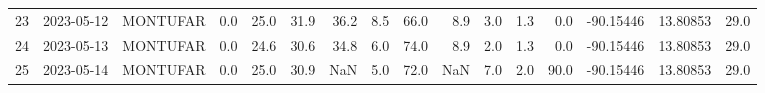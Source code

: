 \documentclass[12pt]{article}
\begin{document}
\begin{center}
\begin{tabular}{lllrrrrrrrrrrrrr}
23  & 2023-05-12 &  MONTUFAR &     0.0 &  25.0 &   31.9 &  36.2 &      8.5 &     66.0 &        8.9 &  3.0 &         1.3 &         0.0 & -90.15446 &  13.80853 &     29.0 \\
24  & 2023-05-13 &  MONTUFAR &     0.0 &  24.6 &   30.6 &  34.8 &      6.0 &     74.0 &        8.9 &  2.0 &         1.3 &         0.0 & -90.15446 &  13.80853 &     29.0 \\
25  & 2023-05-14 &  MONTUFAR &     0.0 &  25.0 &   30.9 &   NaN &      5.0 &     72.0 &        NaN &  7.0 &         2.0 &        90.0 & -90.15446 &  13.80853 &     29.0 \\
\bottomrule
\end{tabular}

        
        \end{center}
        
\end{document}
